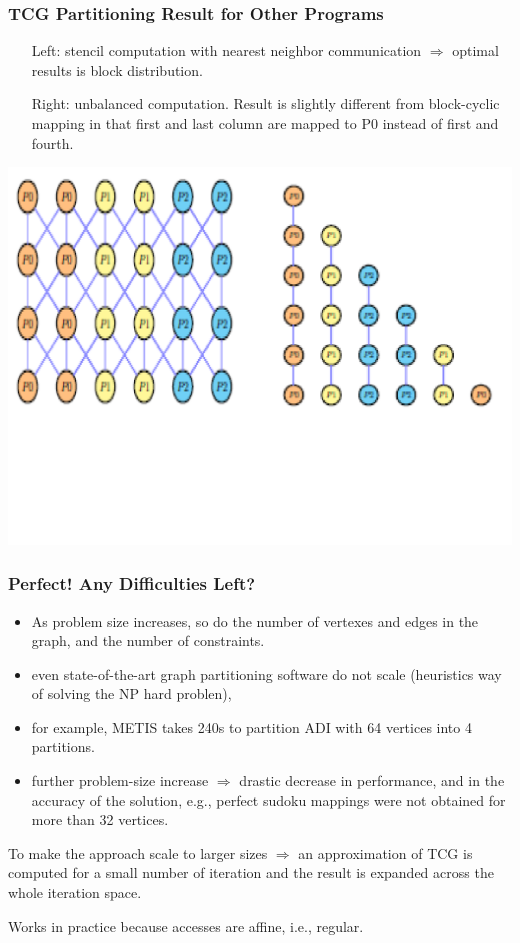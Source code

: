 \documentclass{beamer}
\begin{document}
\begin{frame}[fragile,t]
  \frametitle{TCG Partitioning Result for Other Programs}

\begin{itemize}
    \item[Left:] stencil computation with nearest neighbor
            communication $\Rightarrow$ optimal results 
            is block distribution.
    \item[Right:] unbalanced computation. Result is slightly
            different from block-cyclic mapping in that first
            and last column are mapped to P0 instead of first
            and fourth.
\end  {itemize}


\includegraphics[width=59ex]{Figures/TCGresultStencil}

\end{frame}


\begin{frame}[fragile,t]
  \frametitle{Perfect! Any Difficulties Left?}
\begin{itemize}
    \item As problem size increases, so do the number of
            vertexes and edges in the graph, and the number
            of constraints.
    \item even state-of-the-art graph partitioning software
            do not scale (heuristics way of solving the NP hard problen), 
    \item for example, METIS takes 240s to
            partition ADI with 64 vertices into 4 partitions.
    \item further problem-size increase $\Rightarrow$ \alert{drastic
            decrease in performance, and in the accuracy of the solution},
            e.g., perfect sudoku mappings were not obtained for
            more than 32 vertices.
\end  {itemize}

To make the approach scale to larger sizes $\Rightarrow$ an 
approximation of TCG is computed for a small number of iteration
and the result is expanded across the whole iteration space.\medskip

Works in practice because accesses are affine, i.e., regular.

\end{frame}
\end{document}

